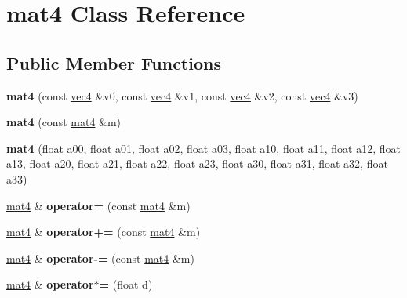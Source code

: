 \hypertarget{classmat4}{\section{mat4 Class Reference}
\label{classmat4}
}
\subsection*{Public Member Functions}
\begin{DoxyCompactItemize}
\item 
\hypertarget{classmat4_aafb0a8ad2c4ae94ff1a3e6a75f83e31e}{{\bfseries mat4} (const \hyperlink{classvec4}{vec4} \&v0, const \hyperlink{classvec4}{vec4} \&v1, const \hyperlink{classvec4}{vec4} \&v2, const \hyperlink{classvec4}{vec4} \&v3)}\label{classmat4_aafb0a8ad2c4ae94ff1a3e6a75f83e31e}

\item 
\hypertarget{classmat4_a77de7784e96322187aa6e2e49fe444ca}{{\bfseries mat4} (const \hyperlink{classmat4}{mat4} \&m)}\label{classmat4_a77de7784e96322187aa6e2e49fe444ca}

\item 
\hypertarget{classmat4_ab26db95fba65d4fc310f58216581f896}{{\bfseries mat4} (float a00, float a01, float a02, float a03, float a10, float a11, float a12, float a13, float a20, float a21, float a22, float a23, float a30, float a31, float a32, float a33)}\label{classmat4_ab26db95fba65d4fc310f58216581f896}

\item 
\hypertarget{classmat4_ab372a3fd891cf6a3ae659dc82f6ac93d}{\hyperlink{classmat4}{mat4} \& {\bfseries operator=} (const \hyperlink{classmat4}{mat4} \&m)}\label{classmat4_ab372a3fd891cf6a3ae659dc82f6ac93d}

\item 
\hypertarget{classmat4_ac8c480dafab0488e1b8a907685903f49}{\hyperlink{classmat4}{mat4} \& {\bfseries operator+=} (const \hyperlink{classmat4}{mat4} \&m)}\label{classmat4_ac8c480dafab0488e1b8a907685903f49}

\item 
\hypertarget{classmat4_a1676d34abda52da8b3a0949a9be5bc78}{\hyperlink{classmat4}{mat4} \& {\bfseries operator-\/=} (const \hyperlink{classmat4}{mat4} \&m)}\label{classmat4_a1676d34abda52da8b3a0949a9be5bc78}

\item 
\hypertarget{classmat4_a82f5152dccdf0a65dff3a3115c54db39}{\hyperlink{classmat4}{mat4} \& {\bfseries operator$\ast$=} (float d)}\label{classmat4_a82f5152dccdf0a65dff3a3115c54db39}


\end{DoxyCompactItemize}
